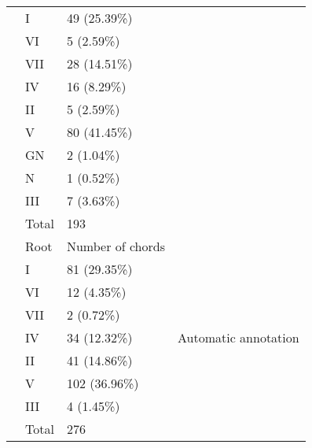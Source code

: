 \begin{table}[]
{\begin{tabular}{|l|l|l|l|}
 & I & 49 (25.39\%) &  \\ \cline{2-3}
 & VI & 5 (2.59\%) &  \\ \cline{2-3}
 & VII & 28 (14.51\%) &  \\ \cline{2-3}
 & IV & 16 (8.29\%) &  \\ \cline{2-3}
 & II & 5 (2.59\%) &  \\ \cline{2-3}
 & V & 80 (41.45\%) &  \\ \cline{2-3}
 & GN & 2 (1.04\%) &  \\ \cline{2-3}
 & N & 1 (0.52\%) &  \\ \cline{2-3}
 & III & 7 (3.63\%) &  \\ \cline{2-3}
 & Total & 193 &  \\ \cline{2-4}
 & Root & Number of chords & \multirow{9}{*}{Automatic annotation} \\ \cline{2-3}
 & I & 81 (29.35\%) &  \\ \cline{2-3}
 & VI & 12 (4.35\%) &  \\ \cline{2-3}
 & VII & 2 (0.72\%) &  \\ \cline{2-3}
 & IV & 34 (12.32\%) &  \\ \cline{2-3}
 & II & 41 (14.86\%) &  \\ \cline{2-3}
 & V & 102 (36.96\%) &  \\ \cline{2-3}
 & III & 4 (1.45\%) &  \\ \cline{2-3}
 & Total & 276 &  \\ \hline
\end{tabular}
}
\label{my-label}
\end{table}


\newpage
